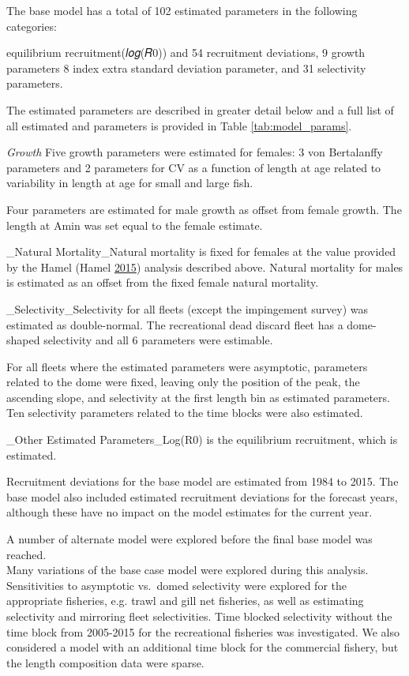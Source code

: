\documentclass[12pt,]{article}
\begin{document}
The base model has a total of 102 estimated parameters in the following
categories:

equilibrium recruitment(𝑙𝑜𝑔(𝑅0)) and 54 recruitment deviations, 9 growth
parameters 8 index extra standard deviation parameter, and 31
selectivity parameters.

The estimated parameters are described in greater detail below and a
full list of all estimated and parameters is provided in Table
\ref{tab:model_params}.

\emph{Growth} Five growth parameters were estimated for females: 3 von
Bertalanffy parameters and 2 parameters for CV as a function of length
at age related to variability in length at age for small and large fish.

Four parameters are estimated for male growth as offset from female
growth. The length at Amin was set equal to the female estimate.

\_Natural Mortality\_Natural mortality is fixed for females at the value
provided by the Hamel (Hamel \protect\hyperlink{ref-Hamel2015}{2015})
analysis described above. Natural mortality for males is estimated as an
offset from the fixed female natural mortality.

\_Selectivity\_Selectivity for all fleets (except the impingement
survey) was estimated as double-normal. The recreational dead discard
fleet has a dome-shaped selectivity and all 6 parameters were estimable.

For all fleets where the estimated parameters were asymptotic,
parameters related to the dome were fixed, leaving only the position of
the peak, the ascending slope, and selectivity at the first length bin
as estimated parameters. Ten selectivity parameters related to the time
blocks were also estimated.

\_Other Estimated Parameters\_Log(R0) is the equilibrium recruitment,
which is estimated.

Recruitment deviations for the base model are estimated from 1984 to
2015. The base model also included estimated recruitment deviations for
the forecast years, although these have no impact on the model estimates
for the current year.

A number of alternate model were explored before the final base model
was reached.\\
Many variations of the base case model were explored during this
analysis. Sensitivities to asymptotic vs.~domed selectivity were
explored for the appropriate fisheries, e.g. trawl and gill net
fisheries, as well as estimating selectivity and mirroring fleet
selectivities. Time blocked selectivity without the time block from
2005-2015 for the recreational fisheries was investigated. We also
considered a model with an additional time block for the commercial
fishery, but the length composition data were sparse.
\end{document}
